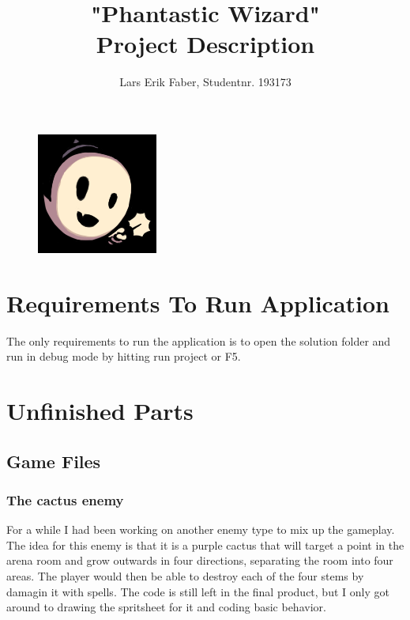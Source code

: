 \documentclass[12pt]{article}
\begin{document}
\title{%
    "Phantastic Wizard"\\
    \large Project Description}
\author{Lars Erik Faber, Studentnr. 193173}
\date{}
\maketitle

\begin{figure}[h!]
    \centering
    \includegraphics[scale=5.0]{images/logo.png}
\end{figure}

\newpage

\tableofcontents

\newpage

\section{Requirements To Run Application}

The only requirements to run the application is to open the solution folder and run in debug mode by hitting run project or F5. 

\section{Unfinished Parts}

    \subsection{Game Files}

        \subsubsection{The cactus enemy}

        For a while I had been working on another enemy type to mix up the gameplay. The idea for this enemy is that it is a purple cactus that will target a point in the arena room and grow outwards in four directions, separating the room into four areas. The player would then be able to destroy each of the four stems by damagin it with spells. The code is still left in the final product, but I only got around to drawing the spritsheet for it and coding basic behavior.
\end{document}
